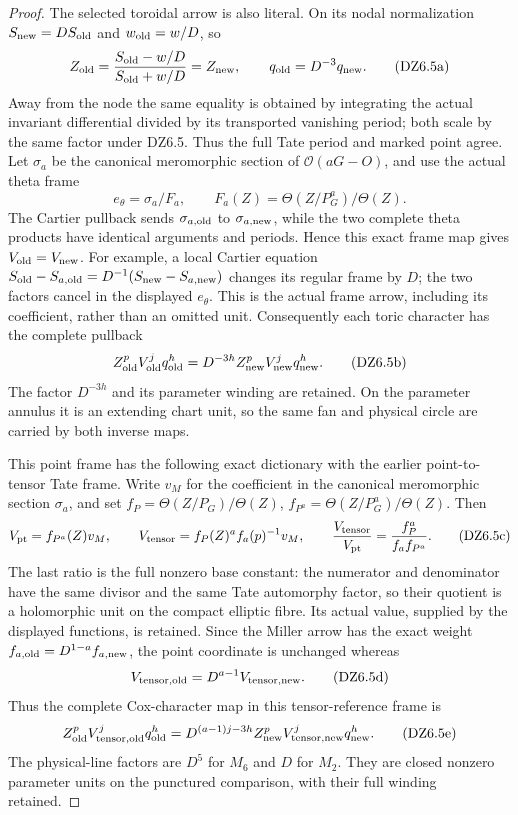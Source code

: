 \begin{proof}
The selected toroidal arrow is also literal. On its nodal
normalization \(S_{\rm new}=D S_{\rm old}\) and
\(w_{\rm old}=w/D\), so
\[
 Z_{\rm old}=\frac{S_{\rm old}-w/D}{S_{\rm old}+w/D}
            =Z_{\rm new},\qquad q_{\rm old}=D^{-3}q_{\rm new}.
 \tag{DZ6.5a}
\]
Away from the node the same equality is obtained by integrating
the actual invariant differential divided by its transported
vanishing period; both scale by the same factor under DZ6.5.
Thus the full Tate period and marked point agree.
Let \(\sigma_a\) be the canonical meromorphic section of
\(\mathcal O(aG-O)\), and use the actual theta frame
\[
 e_\theta=\sigma_a/F_a,\qquad
 F_a(Z)=\Theta(Z/P_G^a)/\Theta(Z).
\]
The Cartier pullback sends \(\sigma_{a,\rm old}\) to
\(\sigma_{a,\rm new}\), while the two complete theta products
have identical arguments and periods. Hence this exact frame
map gives \(V_{\rm old}=V_{\rm new}\).
For example, a local Cartier equation
\(S_{\rm old}-S_{a,\rm old}=D^{-1}(S_{\rm new}-S_{a,\rm new})\)
changes its regular frame by \(D\); the two factors cancel in
the displayed \(e_\theta\). This is the actual frame arrow,
including its coefficient, rather than an omitted unit.
Consequently each toric character has the complete pullback
\[
 Z_{\rm old}^pV_{\rm old}^j q_{\rm old}^h
       =D^{-3h}Z_{\rm new}^pV_{\rm new}^j q_{\rm new}^h.
 \tag{DZ6.5b}
\]
The factor \(D^{-3h}\) and its parameter winding are retained.
On the parameter annulus it is an extending chart unit, so the
same fan and physical circle are carried by both inverse maps.

This point frame has the following exact dictionary with the
earlier point-to-tensor Tate frame. Write \(v_M\) for the
coefficient in the canonical meromorphic section \(\sigma_a\),
and set \(f_P=\Theta(Z/P_G)/\Theta(Z)\),
\(f_{P^a}=\Theta(Z/P_G^a)/\Theta(Z)\). Then
\[
 V_{\rm pt}=f_{P^a}(Z)v_M,\qquad
 V_{\rm tensor}=f_P(Z)^a f_a(p)^{-1}v_M,\qquad
 \frac{V_{\rm tensor}}{V_{\rm pt}}
       =\frac{f_P^a}{f_a f_{P^a}}.
 \tag{DZ6.5c}
\]
The last ratio is the full nonzero base constant: the numerator
and denominator have the same divisor and the same Tate
automorphy factor, so their quotient is a holomorphic unit on
the compact elliptic fibre. Its actual value, supplied by the
displayed functions, is retained. Since the Miller arrow has
the exact weight \(f_{a,\rm old}=D^{1-a}f_{a,\rm new}\),
the point coordinate is unchanged whereas
\[
                 V_{{\rm tensor},\rm old}
                      =D^{a-1}V_{{\rm tensor},\rm new}.
 \tag{DZ6.5d}
\]
Thus the complete Cox-character map in this tensor-reference
frame is
\[
 Z_{\rm old}^pV_{{\rm tensor},\rm old}^j q_{\rm old}^h
  =D^{(a-1)j-3h}
       Z_{\rm new}^pV_{{\rm tensor},\rm new}^j q_{\rm new}^h.
 \tag{DZ6.5e}
\]
The physical-line factors are \(D^5\) for \(M_6\) and \(D\)
for \(M_2\). They are closed nonzero parameter units on the
punctured comparison, with their full winding retained.


\end{proof}
